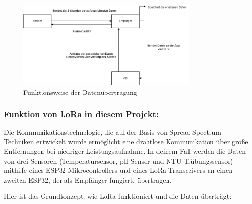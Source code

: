 \begin{figure}[b]
  \centering
  \includegraphics[width=0.8\textwidth]{./pics/Aufbau_Diplomarbeit.png}
  \caption{Funktionsweise der Datenübertragung}
  \label{fig:Datenübertragung}
\end{figure}

\newpage
\subsubsection*{Funktion von LoRa in diesem Projekt:}

Die Kommunikationstechnologie, die auf der Basis von Spread-Spectrum-Techniken entwickelt wurde ermöglicht eine drahtlose 
Kommunikation über große Entfernungen bei niedriger Leistungsaufnahme. 
In deinem Fall werden die Daten von drei Sensoren (Temperatursensor, pH-Sensor und NTU-Trübungssensor) mithilfe eines \newline ESP32-Mikrocontrollers und eines LoRa-Transceivers an einen zweiten ESP32, der als Empfänger fungiert, übertragen.


Hier ist das Grundkonzept, wie LoRa funktioniert und die Daten überträgt:

